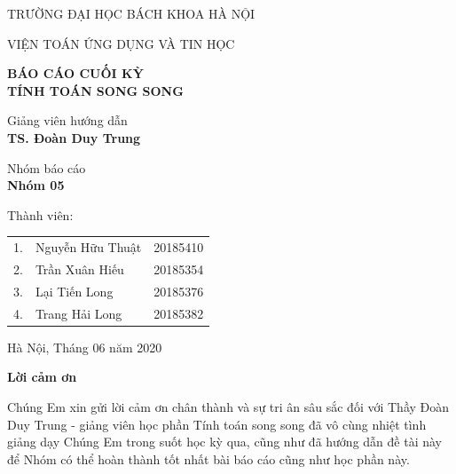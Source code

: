 \documentclass[12pt,a4paper]{article}
\begin{document}
\begin{titlepage}
	\begin{center}

	\LARGE
	TRƯỜNG ĐẠI HỌC BÁCH KHOA HÀ NỘI 
	

	\LARGE
	VIỆN TOÁN ỨNG DỤNG VÀ TIN HỌC
	
	\vspace{1cm}	
	\Large
	\textbf{BÁO CÁO CUỐI KỲ\\TÍNH TOÁN SONG SONG }

	\vspace{0.9cm}
	\normalsize	
	\large Giảng viên hướng dẫn \\
	\vspace{.3cm}
	\large
	\textbf{TS. Đoàn Duy Trung}
	
	\vspace{0.9cm}
	\normalsize	
	\large Nhóm báo cáo \\
	\vspace{.3cm}
	\large
	\textbf{Nhóm 05}
	
	\vspace{0.9cm}
	\normalsize	
	 \large Thành viên: \\
	 \end{center}

	\vspace{.3cm}
\begin{center}
	\begin{tabular}{lll}
		\Large 1.   &  \Large  Nguyễn Hữu Thuật & \Large 20185410\\
		\Large 2. & \Large Trần Xuân Hiếu  & \Large 20185354\\
		\Large 3.  & \Large Lại Tiến Long  & \Large 20185376 \\
		\Large 4.  & \Large Trang Hải Long  & \Large 20185382\\
		
	\end{tabular}	
\end{center}

\vspace{1.5cm}
\begin{center}
\large Hà Nội, Tháng 06 năm 2020
\end{center}
\end{titlepage}
	\newpage
\begin{center}
\textbf{\textbf{\Large  Lời cảm ơn}}
\end{center}	

Chúng Em xin gửi lời cảm ơn chân thành và sự tri ân sâu sắc đối với Thầy Đoàn Duy Trung - giảng viên học phần Tính toán song song đã vô cùng nhiệt tình giảng dạy Chúng Em trong suốt học kỳ qua, cũng như đã hướng dẫn đề tài này để Nhóm có thể hoàn thành tốt nhất bài báo cáo cũng như học phần này.\\
\end{document}
